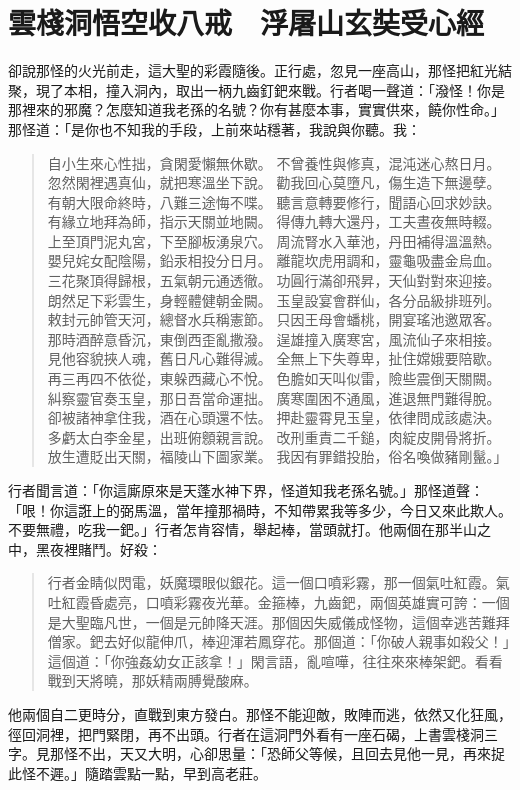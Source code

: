 
\chapter{雲棧洞悟空收八戒　浮屠山玄奘受心經}

卻說那怪的火光前走，這大聖的彩霞隨後。正行處，忽見一座高山，那怪把紅光結聚，現了本相，撞入洞內，取出一柄九齒釘鈀來戰。行者喝一聲道：「潑怪！你是那裡來的邪魔？怎麼知道我老孫的名號？你有甚麼本事，實實供來，饒你性命。」那怪道：「是你也不知我的手段，上前來站穩著，我說與你聽。我：
\begin{quote}
自小生來心性拙，貪閑愛懶無休歇。
不曾養性與修真，混沌迷心熬日月。
忽然閑裡遇真仙，就把寒溫坐下說。
勸我回心莫墮凡，傷生造下無邊孽。
有朝大限命終時，八難三途悔不喋。
聽言意轉要修行，聞語心回求妙訣。
有緣立地拜為師，指示天關並地闕。
得傳九轉大還丹，工夫晝夜無時輟。
上至頂門泥丸宮，下至腳板湧泉穴。
周流腎水入華池，丹田補得溫溫熱。
嬰兒姹女配陰陽，鉛汞相投分日月。
離龍坎虎用調和，靈龜吸盡金烏血。
三花聚頂得歸根，五氣朝元通透徹。
功圓行滿卻飛昇，天仙對對來迎接。
朗然足下彩雲生，身輕體健朝金闕。
玉皇設宴會群仙，各分品級排班列。
敕封元帥管天河，總督水兵稱憲節。
只因王母會蟠桃，開宴瑤池邀眾客。
那時酒醉意昏沉，東倒西歪亂撒潑。
逞雄撞入廣寒宮，風流仙子來相接。
見他容貌挾人魂，舊日凡心難得滅。
全無上下失尊卑，扯住嫦娥要陪歇。
再三再四不依從，東躲西藏心不悅。
色膽如天叫似雷，險些震倒天關闕。
糾察靈官奏玉皇，那日吾當命運拙。
廣寒圍困不通風，進退無門難得脫。
卻被諸神拿住我，酒在心頭還不怯。
押赴靈霄見玉皇，依律問成該處決。
多虧太白李金星，出班俯顖親言說。
改刑重責二千鎚，肉綻皮開骨將折。
放生遭貶出天關，福陵山下圖家業。
我因有罪錯投胎，俗名喚做豬剛鬣。」
\end{quote}

行者聞言道：「你這廝原來是天蓬水神下界，怪道知我老孫名號。」那怪道聲：「哏！你這誑上的弼馬溫，當年撞那禍時，不知帶累我等多少，今日又來此欺人。不要無禮，吃我一鈀。」行者怎肯容情，舉起棒，當頭就打。他兩個在那半山之中，黑夜裡賭鬥。好殺：
\begin{quote}
行者金睛似閃電，妖魔環眼似銀花。這一個口噴彩霧，那一個氣吐紅霞。氣吐紅霞昏處亮，口噴彩霧夜光華。金箍棒，九齒鈀，兩個英雄實可誇：一個是大聖臨凡世，一個是元帥降天涯。那個因失威儀成怪物，這個幸逃苦難拜僧家。鈀去好似龍伸爪，棒迎渾若鳳穿花。那個道：「你破人親事如殺父！」這個道：「你強姦幼女正該拿！」閑言語，亂喧嘩，往往來來棒架鈀。看看戰到天將曉，那妖精兩膊覺酸麻。
\end{quote}

他兩個自二更時分，直戰到東方發白。那怪不能迎敵，敗陣而逃，依然又化狂風，徑回洞裡，把門緊閉，再不出頭。行者在這洞門外看有一座石碣，上書雲棧洞三字。見那怪不出，天又大明，心卻思量：「恐師父等候，且回去見他一見，再來捉此怪不遲。」隨踏雲點一點，早到高老莊。


